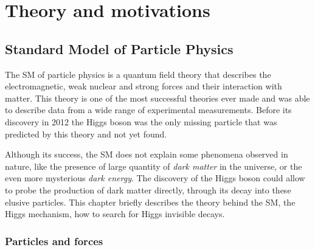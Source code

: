 \chapter{Theory and motivations}
\label{CHAPTER:TheoryAndMotivations}

\glsresetall %

\section{Standard Model of Particle Physics}


The \gls{SM} of particle physics is a quantum field theory that describes the electromagnetic, weak nuclear and strong forces and their interaction with matter. This theory is one of the most successful theories ever made and was able to describe data from a wide range of experimental measurements. Before its discovery in 2012 \cite{ARTICLE:ATLAS_HiggsDiscovery,ARTICLE:CMS_HiggsDiscovery} the Higgs boson was the only missing particle that was predicted by this theory and not yet found. 

Although its success, the \gls{SM} does not explain some phenomena observed in nature, like the presence of large quantity of \textit{dark matter} in the universe, or the even more mysterious \textit{dark energy}. The discovery of the Higgs boson could allow to probe the production of dark matter directly, through its decay into these elusive particles. This chapter briefly describes the theory behind the \gls{SM}, the Higgs mechanism, how to search for Higgs invisible decays.

\subsection{Particles and forces}
\label{SUBSECTION:Theory_SM_ParticlesAndForces}







